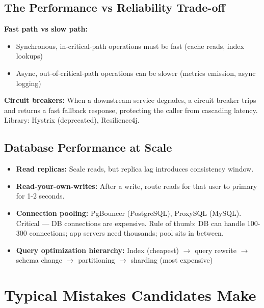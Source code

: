 \documentclass[11pt]{article}
\providecommand{\tightlist}{\setlength{\itemsep}{1pt}\setlength{\parskip}{0pt}}
\begin{document}
\subsection{The Performance vs Reliability Trade-off}\label{the-performance-vs-reliability-trade-off}

\textbf{Fast path vs slow path:}

\begin{itemize}
\tightlist
\item
  Synchronous, in-critical-path operations must be fast (cache reads, index lookups)
\item
  Async, out-of-critical-path operations can be slower (metrics emission, async logging)
\end{itemize}

\textbf{Circuit breakers:} When a downstream service degrades, a circuit breaker trips and returns a fast fallback response, protecting the caller from cascading latency. Library: Hystrix (deprecated), Resilience4j.

\subsection{Database Performance at Scale}\label{database-performance-at-scale}

\begin{itemize}
\tightlist
\item
  \textbf{Read replicas:} Scale reads, but replica lag introduces consistency window.
\item
  \textbf{Read-your-own-writes:} After a write, route reads for that user to primary for 1-2 seconds.
\item
  \textbf{Connection pooling:} PgBouncer (PostgreSQL), ProxySQL (MySQL). Critical --- DB connections are expensive. Rule of thumb: DB can handle 100-300 connections; app servers need thousands; pool sits in between.
\item
  \textbf{Query optimization hierarchy:} Index (cheapest) \(\rightarrow\) query rewrite \(\rightarrow\) schema change \(\rightarrow\) partitioning \(\rightarrow\) sharding (most expensive)
\end{itemize}

\section{Typical Mistakes Candidates Make}\label{typical-mistakes-candidates-make}
\end{document}
